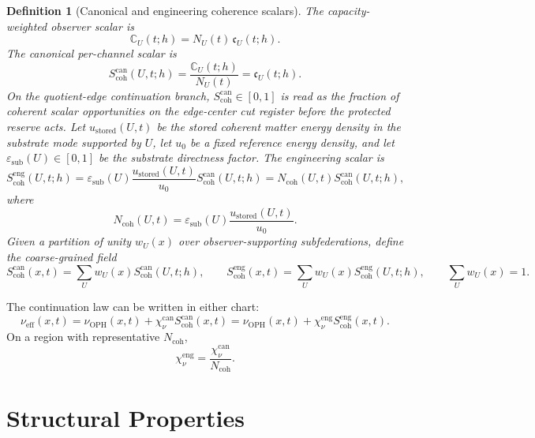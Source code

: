 \documentclass[11pt]{article}
\numberwithin{equation}{section}
\newtheorem{definition}[theorem]{Definition}
\theoremstyle{remark}
\newcommand{\chican}{\chi_\nu^{\mathrm{can}}}
\newcommand{\chieng}{\chi_\nu^{\mathrm{eng}}}
\newcommand{\scohcan}{S_{\mathrm{coh}}^{\mathrm{can}}}
\newcommand{\scoheng}{S_{\mathrm{coh}}^{\mathrm{eng}}}
\newcommand{\Ncoh}{N_{\mathrm{coh}}}
\newcommand{\nueff}{\nu_{\mathrm{eff}}}
\newcommand{\nuoph}{\nu_{\mathrm{OPH}}}
\newcommand{\eps}{\varepsilon}
\begin{document}
\begin{definition}[Canonical and engineering coherence scalars]
The capacity-weighted observer scalar is
\begin{equation}
\mathbb C_U(t;h)=N_U(t)\,\mathfrak c_U(t;h).
\label{eq:canonical-mass}
\end{equation}
The canonical per-channel scalar is
\begin{equation}
\boxed{
\scohcan(U,t;h)=\frac{\mathbb C_U(t;h)}{N_U(t)}
=
\mathfrak c_U(t;h).
}
\label{eq:Scoh-can-patch}
\end{equation}
On the quotient-edge continuation branch, \(\scohcan\in[0,1]\) is read as the
fraction of coherent scalar opportunities on the edge-center cut register
before the protected reserve acts.
Let \(u_{\mathrm{stored}}(U,t)\) be the stored coherent matter energy density in
the substrate mode supported by \(U\), let \(u_0\) be a fixed reference energy
density, and let \(\eps_{\mathrm{sub}}(U)\in[0,1]\) be the substrate directness
factor. The engineering scalar is
\begin{equation}
\scoheng(U,t;h)
=
\eps_{\mathrm{sub}}(U)
\frac{u_{\mathrm{stored}}(U,t)}{u_0}
\scohcan(U,t;h)
=
\Ncoh(U,t)\scohcan(U,t;h),
\label{eq:Scoh-eng-patch}
\end{equation}
where
\begin{equation}
\boxed{
\Ncoh(U,t)=
\eps_{\mathrm{sub}}(U)\frac{u_{\mathrm{stored}}(U,t)}{u_0}.
}
\label{eq:Ncoh}
\end{equation}
Given a partition of unity \(w_U(x)\) over observer-supporting subfederations,
define the coarse-grained field
\begin{equation}
\scohcan(x,t)=\sum_U w_U(x)\scohcan(U,t;h),
\qquad
\scoheng(x,t)=\sum_U w_U(x)\scoheng(U,t;h),
\qquad
\sum_U w_U(x)=1.
\label{eq:Scoh-field}
\end{equation}
\end{definition}

The continuation law can be written in either chart:
\begin{equation}
\boxed{
\nueff(x,t)
=
\nuoph(x,t)+\chican\scohcan(x,t)
=
\nuoph(x,t)+\chieng\scoheng(x,t).
}
\label{eq:continuation-axiom}
\end{equation}
On a region with representative \(\Ncoh\),
\begin{equation}
\boxed{
\chieng=\frac{\chican}{\Ncoh}.
}
\label{eq:chart-map}
\end{equation}

\section{Structural Properties}
\end{document}
